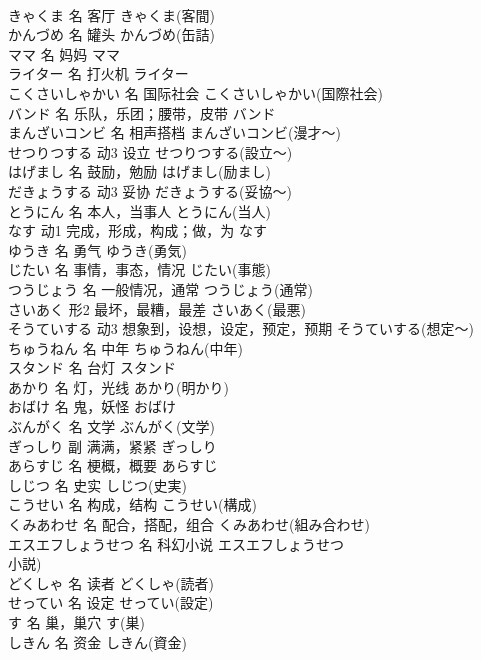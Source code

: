 \documentclass[8pt]{extreport}
\begin{document}
\begin{CJK}{UTF8}{min}
\\	きゃくま	名	客厅	きゃくま(客間)	
\\	かんづめ	名	罐头	かんづめ(缶詰)	
\\	ママ	名	妈妈	ママ	
\\	ライター	名	打火机	ライター	
\\	こくさいしゃかい	名	国际社会	こくさいしゃかい(国際社会)	
\\	バンド	名	乐队，乐团；腰带，皮带	バンド	
\\	まんざいコンビ	名	相声搭档	まんざいコンビ(漫才～)	
\\	せつりつする	动3	设立	せつりつする(設立～)	
\\	はげまし	名	鼓励，勉励	はげまし(励まし)	
\\	だきょうする	动3	妥协	だきょうする(妥協～)	
\\	とうにん	名	本人，当事人	とうにん(当人)	
\\	なす	动1	完成，形成，构成；做，为	なす	
\\	ゆうき	名	勇气	ゆうき(勇気)	
\\	じたい	名	事情，事态，情况	じたい(事態)	
\\	つうじょう	名	一般情况，通常	つうじょう(通常)	
\\	さいあく	形2	最坏，最糟，最差	さいあく(最悪)	
\\	そうていする	动3	想象到，设想，设定，预定，预期	そうていする(想定～)	
\\	ちゅうねん	名	中年	ちゅうねん(中年)	
\\	スタンド	名	台灯	スタンド	
\\	あかり	名	灯，光线	あかり(明かり)	
\\	おばけ	名	鬼，妖怪	おばけ	
\\	ぶんがく	名	文学	ぶんがく(文学)	
\\	ぎっしり	副	满满，紧紧	ぎっしり	
\\	あらすじ	名	梗概，概要	あらすじ	
\\	しじつ	名	史实	しじつ(史実)	
\\	こうせい	名	构成，结构	こうせい(構成)	
\\	くみあわせ	名	配合，搭配，组合	くみあわせ(組み合わせ)	
\\	エスエフしょうせつ	名	科幻小说	エスエフしょうせつ
\\	小説)	
\\	どくしゃ	名	读者	どくしゃ(読者)	
\\	せってい	名	设定	せってい(設定)	
\\	す	名	巢，巢穴	す(巣)	
\\	しきん	名	资金	しきん(資金)	

\end{CJK}
\end{document}
